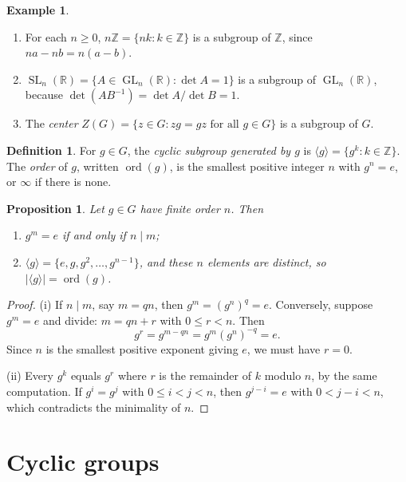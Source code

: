 \documentclass[11pt]{article}
\theoremstyle{plain}
\newtheorem{proposition}[theorem]{Proposition}
\theoremstyle{definition}
\newtheorem{definition}[theorem]{Definition}
\newtheorem{example}[theorem]{Example}
\theoremstyle{remark}
\newcommand{\Z}{\mathbb{Z}}
\newcommand{\R}{\mathbb{R}}
\newcommand{\gen}[1]{\langle #1 \rangle}
\DeclareMathOperator{\GL}{GL}
\DeclareMathOperator{\SL}{SL}
\DeclareMathOperator{\ord}{ord}
\begin{document}
\begin{example}\label{ex:subgroups}
\leavevmode
\begin{enumerate}[label=(\alph*)]
  \item For each $n \ge 0$, $n\Z = \{nk : k \in \Z\}$ is a subgroup of $\Z$, since $na - nb = n(a - b)$.
  \item $\SL_n(\R) = \{A \in \GL_n(\R) : \det A = 1\}$ is a subgroup of $\GL_n(\R)$, because $\det(AB^{-1}) = \det A / \det B = 1$.
  \item The \emph{center} $Z(G) = \{z \in G : zg = gz \text{ for all } g \in G\}$ is a subgroup of $G$.
\end{enumerate}
\end{example}

\begin{definition}
For $g \in G$, the \emph{cyclic subgroup generated by $g$} is $\gen{g} = \{g^k : k \in \Z\}$. The \emph{order} of $g$, written $\ord(g)$, is the smallest positive integer $n$ with $g^n = e$, or $\infty$ if there is none.
\end{definition}

\begin{proposition}\label{prop:order}
Let $g \in G$ have finite order $n$. Then
\begin{enumerate}[label=\textup{(\roman*)}]
  \item $g^m = e$ if and only if $n \mid m$;
  \item $\gen{g} = \{e, g, g^2, \dots, g^{n-1}\}$, and these $n$ elements are distinct, so $|\gen{g}| = \ord(g)$.
\end{enumerate}
\end{proposition}

\begin{proof}
(i) If $n \mid m$, say $m = qn$, then $g^m = (g^n)^q = e$. Conversely, suppose $g^m = e$ and divide: $m = qn + r$ with $0 \le r < n$. Then
\[
  g^r = g^{m - qn} = g^m (g^n)^{-q} = e.
\]
Since $n$ is the smallest positive exponent giving $e$, we must have $r = 0$.

(ii) Every $g^k$ equals $g^r$ where $r$ is the remainder of $k$ modulo $n$, by the same computation. If $g^i = g^j$ with $0 \le i < j < n$, then $g^{j-i} = e$ with $0 < j - i < n$, which contradicts the minimality of $n$.
\end{proof}

\section{Cyclic groups}
\end{document}
